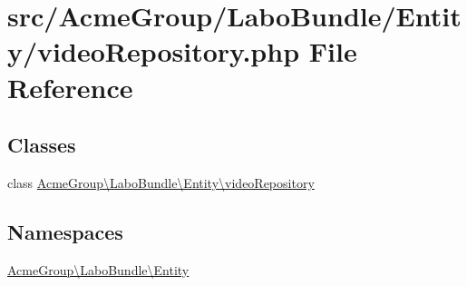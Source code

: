 \hypertarget{video_repository_8php}{\section{src/\+Acme\+Group/\+Labo\+Bundle/\+Entity/video\+Repository.php File Reference}
\label{video_repository_8php}
}
\subsection*{Classes}
\begin{DoxyCompactItemize}
\item 
class \hyperlink{class_acme_group_1_1_labo_bundle_1_1_entity_1_1video_repository}{Acme\+Group\textbackslash{}\+Labo\+Bundle\textbackslash{}\+Entity\textbackslash{}video\+Repository}
\end{DoxyCompactItemize}
\subsection*{Namespaces}
\begin{DoxyCompactItemize}
\item 
 \hyperlink{namespace_acme_group_1_1_labo_bundle_1_1_entity}{Acme\+Group\textbackslash{}\+Labo\+Bundle\textbackslash{}\+Entity}
\end{DoxyCompactItemize}
